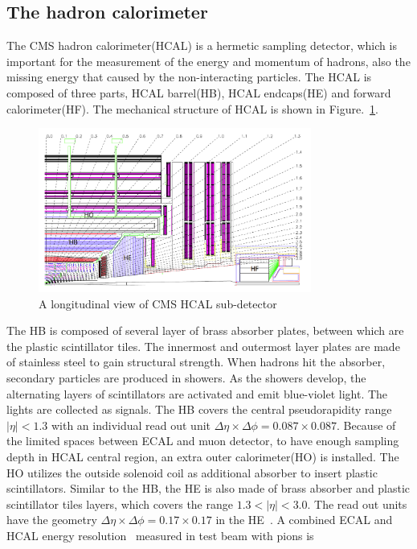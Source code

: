 \subsection{The hadron calorimeter}

The CMS hadron calorimeter(HCAL) is a hermetic sampling detector, which is important for the measurement of the energy and momentum of hadrons, also the missing energy that caused by the non-interacting particles.  The HCAL is composed of three parts, HCAL barrel(HB), HCAL endcaps(HE) and forward calorimeter(HF). The mechanical structure of HCAL is shown in Figure.~\ref{fig:HCALL_sketch}. 

\begin{figure}[htbp] 
\centering
\includegraphics[width=0.8\textwidth]{chapter3/HCAL_sketch.png}
\caption{A longitudinal view of CMS HCAL sub-detector~\cite{CMS_experiment}}
\label{fig:HCALL_sketch}
\end{figure}


The HB is composed of  several layer of brass absorber plates, between which are the plastic scintillator tiles. The innermost and outermost layer plates are made of stainless steel to gain structural strength. When hadrons hit the absorber, secondary particles are produced in showers. As the showers develop, the alternating layers of scintillators are activated and emit blue-violet light. The lights are collected as signals. The HB covers the central pseudorapidity range $|\eta|<1.3$ with an individual read out unit $\Delta \eta\times\Delta\phi=0.087\times 0.087$. Because of the limited spaces between ECAL and muon detector, to have enough sampling depth in HCAL central region, an extra outer calorimeter(HO) is installed. The HO utilizes the outside solenoid coil as additional absorber to insert plastic scintillators. Similar to the HB, the HE is also made of brass absorber and plastic scintillator tiles layers, which covers the range $1.3<|\eta|<3.0$. The read out units have the geometry $\Delta \eta\times\Delta\phi=0.17\times 0.17$ in the HE~\cite{CMS_experiment}. A combined ECAL and HCAL energy resolution~\cite{HCAL_reso} measured in test beam with pions is 

